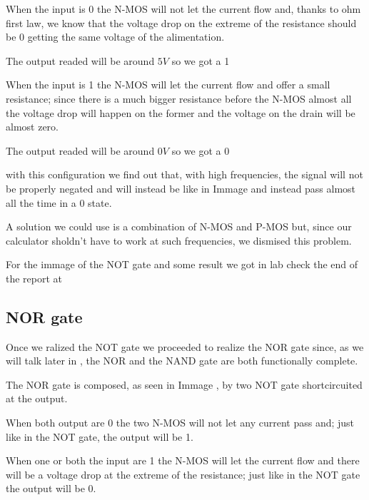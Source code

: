 \documentclass{article}
\begin{document}
When the input is 0 the N-MOS will not let the current flow and, thanks to ohm first law, we know that the voltage drop on the extreme of the resistance should be 0 getting the same voltage of the alimentation. 

The output readed  will be around $5V$ so we got a 1

When the input is 1 the N-MOS will let the current flow and offer a small resistance; since there is a much bigger resistance before the N-MOS almost all the voltage drop will happen on the former and the voltage on the drain will be almost zero.

The output readed will be around $0V$ so we got a 0

\vspace{3mm}

with this configuration we find out that, with high frequencies, the signal will not be properly negated and will instead be like in Immage%
and instead pass almost all the time in a 0 state. 

A solution we could use is a combination of N-MOS and P-MOS but, since our calculator sholdn't have to work at such frequencies, we dismised this problem.

\vspace{3mm}

For the immage of the NOT gate and some result we got in lab check the end of the report at %



\subsection{NOR gate}

Once we ralized the NOT gate we proceeded to realize the NOR gate since, as we will talk later in %
, the NOR and the NAND gate are both functionally complete.

The NOR gate is composed, as seen in Immage%
, by two NOT gate shortcircuited at the output.


\vspace{3mm} %

When both output are 0 the two N-MOS will not let any current pass and; just like in the NOT gate, the output will be 1.

When one or both the input are 1 the N-MOS will let the current flow and there will be a voltage drop at the extreme of the resistance; just like in the NOT gate the output will be 0.
\end{document}
